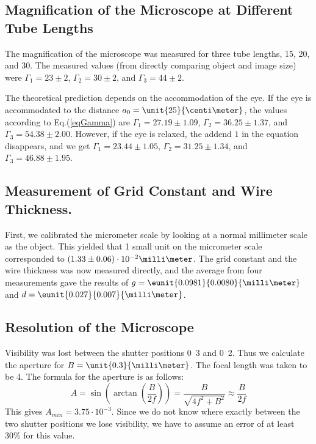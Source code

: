 \documentclass[a4paper,10pt]{article}
\begin{document}
\subsection{Magnification of the Microscope at Different Tube Lengths}
The magnification of the microscope was measured for three tube lengths, \unit{15}{\centi\meter}, \unit{20}{\centi\meter}, and \unit{30}{\centi\meter}. The measured values (from directly comparing object and image size) were $\Gamma_1=23 \pm 2$, $\Gamma_2=30 \pm 2$, and $\Gamma_3=44 \pm 2$.

The theoretical prediction depends on the accommodation of the eye. If the eye is accommodated to the distance $a_0 = \unit{25}{\centi\meter}$, the values according to Eq.(\ref{eqGamma}) are $\Gamma_1=27.19 \pm 1.09$, $\Gamma_2=36.25 \pm 1.37$, and $\Gamma_3=54.38 \pm 2.00$. However, if the eye is relaxed, the addend $1$ in the equation disappears, and we get $\Gamma_1=23.44 \pm 1.05$, $\Gamma_2=31.25 \pm 1.34$, and $\Gamma_3=46.88 \pm 1.95$.

\subsection{Measurement of Grid Constant and Wire Thickness.}
First, we calibrated the micrometer scale by looking at a normal millimeter scale as the object. This yielded that 1 small unit on the micrometer scale corresponded to $(1.33 \pm 0.06) \cdot 10^{-2} \milli\meter$. The grid constant and the wire thickness was now measured directly, and the average from four measurements gave the results of $g=\eunit{0.0981}{0.0080}{\milli\meter}$ and $d=\eunit{0.027}{0.007}{\milli\meter}$.

\subsection{Resolution of the Microscope}
Visibility was lost between the shutter positions \unit{0.3}{\milli\meter} and \unit{0.2}{\milli\meter}. Thus we calculate the aperture for $B=\unit{0.3}{\milli\meter}$. The focal length was taken to be \unit{4}{\centi\meter}. The formula for the aperture is as follows:
\begin{equation}
A=\sin\left( \arctan\left( \frac{B}{2f} \right) \right) = \frac{B}{\sqrt{4f^2+B^2}} \approx \frac{B}{2f}
\end{equation}
This gives $A_{min} = 3.75 \cdot 10^{-3}$. Since we do not know where exactly between the two shutter positions we lose visibility, we have to assume an error of at least 30\% for this value.
\end{document}
